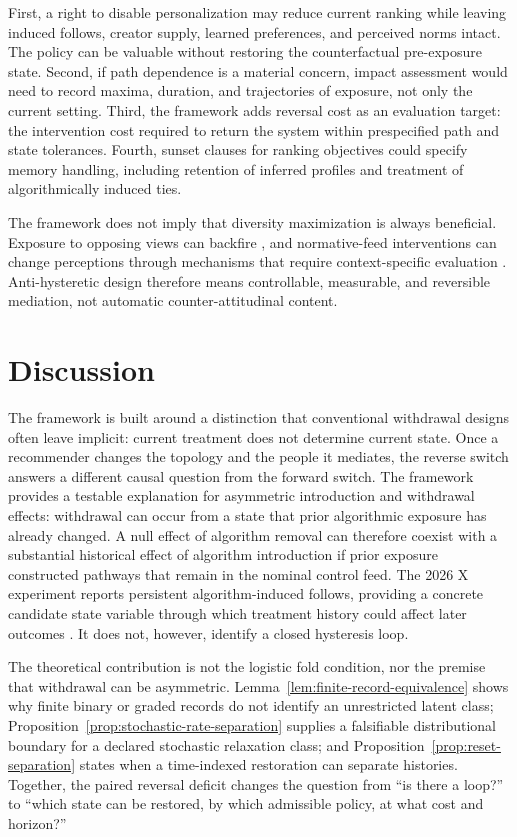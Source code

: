 \documentclass[pdflatex,sn-mathphys-num]{sn-jnl}
\begin{document}
First, a right to disable personalization may reduce current ranking while leaving induced follows, creator supply, learned preferences, and perceived norms intact. The policy can be valuable without restoring the counterfactual pre-exposure state. Second, if path dependence is a material concern, impact assessment would need to record maxima, duration, and trajectories of exposure, not only the current setting. Third, the framework adds reversal cost as an evaluation target: the intervention cost required to return the system within prespecified path and state tolerances. Fourth, sunset clauses for ranking objectives could specify memory handling, including retention of inferred profiles and treatment of algorithmically induced ties.

The framework does not imply that diversity maximization is always beneficial. Exposure to opposing views can backfire \cite{bail2018opposing}, and normative-feed interventions can change perceptions through mechanisms that require context-specific evaluation \cite{brady2026norms}. Anti-hysteretic design therefore means controllable, measurable, and reversible mediation, not automatic counter-attitudinal content.

\section{Discussion}

The framework is built around a distinction that conventional withdrawal designs often leave implicit: current treatment does not determine current state. Once a recommender changes the topology and the people it mediates, the reverse switch answers a different causal question from the forward switch. The framework provides a testable explanation for asymmetric introduction and withdrawal effects: withdrawal can occur from a state that prior algorithmic exposure has already changed. A null effect of algorithm removal can therefore coexist with a substantial historical effect of algorithm introduction if prior exposure constructed pathways that remain in the nominal control feed. The 2026 X experiment reports persistent algorithm-induced follows, providing a concrete candidate state variable through which treatment history could affect later outcomes \cite{gauthier2026x}. It does not, however, identify a closed hysteresis loop.

The theoretical contribution is not the logistic fold condition, nor the premise that withdrawal can be asymmetric. Lemma~\ref{lem:finite-record-equivalence} shows why finite binary or graded records do not identify an unrestricted latent class; Proposition~\ref{prop:stochastic-rate-separation} supplies a falsifiable distributional boundary for a declared stochastic relaxation class; and Proposition~\ref{prop:reset-separation} states when a time-indexed restoration can separate histories. Together, the paired reversal deficit changes the question from ``is there a loop?'' to ``which state can be restored, by which admissible policy, at what cost and horizon?''
\end{document}

